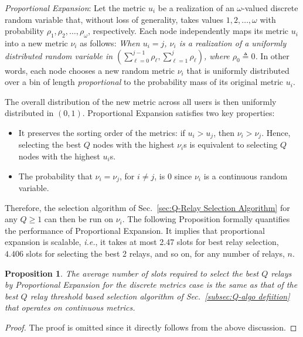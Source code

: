 \documentclass[12pt,draftcls,peerreview, onecolumn]{IEEEtran}
\newtheorem{proposition}{Proposition}
\newcommand{\define}{\triangleq}
\newcommand{\ie}{{\it i.e.}}
\begin{document}
{\em Proportional Expansion}: Let the metric $u_i$ be a realization of an
$\omega$-valued discrete random variable that, without loss of
generality, takes values $1,2,\ldots,\omega$ with probability
$\rho_1,\rho_2,\ldots,\rho_{\omega}$, respectively. Each node
independently maps its metric $u_i$ into a new metric $\nu_i$ as
follows: {\em When $u_i = j$, $\nu_i$ is a realization of a uniformly
  distributed random variable in $\left(\sum_{\ell=0}^{j-1}\rho_\ell,
    \sum_{\ell=1}^{j}\rho_\ell \right)$, where $\rho_0 \define 0$.}
In other words, each node chooses a new random metric $\nu_i$ that is
uniformly distributed over a bin of length {\it proportional} to the
probability mass of its original metric $u_i$.

The overall distribution of the new metric across all users is then
uniformly distributed in $(0,1)$.  Proportional Expansion satisfies two key
properties:
\begin{itemize}
\item It preserves the sorting order of the metrics: if $u_{i} >
  u_{j}$, then $\nu_{i} > \nu_{j}$. Hence, selecting the best $Q$
  nodes with the highest $\nu_i$s is equivalent to selecting $Q$ nodes
  with the highest $u_i$s.

\item The probability that $\nu_i = \nu_j$, for $i \neq j$, is 0 since
  $\nu_i$ is a continuous random variable.
\end{itemize}

Therefore, the selection algorithm of Sec.~\ref{sec:Q-Relay Selection
  Algorithm} for any $Q \geq 1$ can then be run on $\nu_{i}$.  The
following Proposition formally quantifies the performance of
Proportional Expansion. It implies that proportional expansion is
scalable, \ie, it takes at most 2.47 slots for best relay selection,
$4.406$ slots for selecting the best 2 relays, and so on, for any
number of relays, $n$.

\begin{proposition}
\label{disc_metric}
The average number of slots required to select the best $Q$ relays by
Proportional Expansion for the discrete metrics case is the same as
that of the best $Q$ relay threshold based selection algorithm of
Sec.~\ref{subsec:Q-algo defiition} that operates on continuous
metrics.
\end{proposition}
\begin{proof}
The proof is omitted since it directly follows from the above discussion.
\end{proof}
\end{document}
